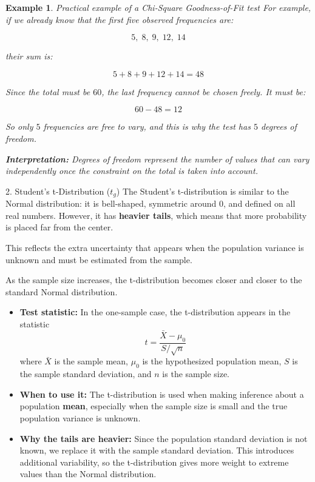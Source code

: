 \documentclass[11pt]{article}
\theoremstyle{smallexample}
\newtheorem{example}{Example}[section]
\newcommand{\vs}{\vspace{0.2\baselineskip}}
\begin{document}
\begin{example}{Practical example of a Chi-Square Goodness-of-Fit test}
For example, if we already know that the first five observed frequencies are:

\[
5,\;8,\;9,\;12,\;14
\]

their sum is:

\[
5+8+9+12+14=48
\]

Since the total must be \(60\), the last frequency cannot be chosen freely. It must be:

\[
60-48=12
\]

So only \(5\) frequencies are free to vary, and this is why the test has \(5\) degrees of freedom.

\textbf{Interpretation:} Degrees of freedom represent the number of values that can vary independently once the constraint on the total is taken into account.

\end{example}


\vs


\begin{defbox}{2. Student's t-Distribution (\(t_g\))}
The Student's t-distribution is similar to the Normal distribution: it is bell-shaped, symmetric around 0, and defined on all real numbers. However, it has \textbf{heavier tails}, which means that more probability is placed far from the center. 

\vs

This reflects the extra uncertainty that appears when the population variance is unknown and must be estimated from the sample.

\vs
As the sample size increases, the t-distribution becomes closer and closer to the standard Normal distribution.

\begin{itemize}

    \item \textbf{Test statistic:} In the one-sample case, the t-distribution appears in the statistic
    \begin{equation}
    t=\frac{\bar{X}-\mu_0}{S/\sqrt{n}}
    \end{equation}
    where \(\bar{X}\) is the sample mean, \(\mu_0\) is the hypothesized population mean, \(S\) is the sample standard deviation, and \(n\) is the sample size.

    \vs

      \item  \textbf{When to use it:} The t-distribution is used when making inference about a population \textbf{mean}, especially when the sample size is small and the true population variance is unknown.

   \vs
   \item \textbf{Why the tails are heavier:} Since the population standard deviation is not known, we replace it with the sample standard deviation. This introduces additional variability, so the t-distribution gives more weight to extreme values than the Normal distribution.


\end{itemize}
\end{defbox}
\end{document}
